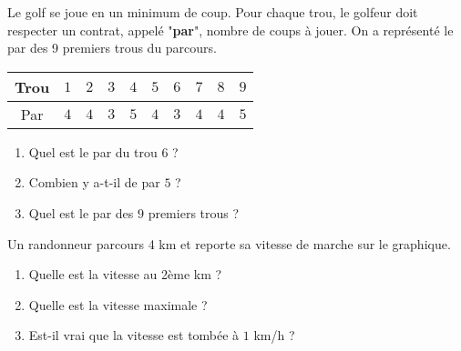 \begin{pageParcoursu} 


Le golf se joue en un minimum de coup. Pour chaque trou, le golfeur doit respecter un contrat, appelé "\textbf{par}", nombre de coups à jouer. On a représenté le par des 9 premiers trous du parcours. 

 \begin{center}
 \begin{tabular}{|c|c|c|c|c|c|c|c|c|c|} \hline
  Trou  & $1$ & $2$ & $3$ &  $4$ & $5$ & $6$  &  $7$ & $8$ & $9$ \\  \hline
  Par & $4$ & $4$ &$3$ & $5$ & $4$ &  $3$ & $4$ &$4$ & $5$   \\\hline
 \end{tabular}
 \end{center}
 
\begin{enumerate}[leftmargin=*] 
 \item Quel est le par du trou $6$ ? 
 \item Combien y a-t-il de par $5$ ? 
 \item Quel est le par des $9$ premiers trous ? 
\end{enumerate} 
 



Un randonneur parcours 4 km et reporte sa vitesse de marche sur le graphique.

\begin{minipage}{0.38\linewidth}
\begin{center}
\end{center}
\end{minipage}
\begin{minipage}{0.58\linewidth}
 \begin{enumerate}
 	\item Quelle est la vitesse au 2ème km ? 
 	\item Quelle est la vitesse maximale ? 
 	\item Est-il vrai que la vitesse est tombée à $1$ km/h ?
 \end{enumerate}
\end{minipage} 
 

\end{pageParcoursu}
